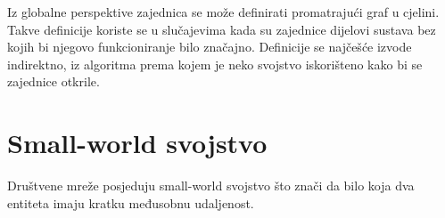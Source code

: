 Iz globalne perspektive zajednica se može definirati promatrajući graf u cjelini. Takve definicije koriste se u slučajevima kada su zajednice dijelovi sustava bez kojih bi njegovo funkcioniranje bilo značajno. Definicije se najčešće izvode indirektno, iz algoritma prema kojem je neko svojstvo iskorišteno kako bi se zajednice otkrile. 

\section{Small-world svojstvo}

Društvene mreže posjeduju small-world svojstvo što znači da bilo koja dva entiteta imaju kratku međusobnu udaljenost. 
